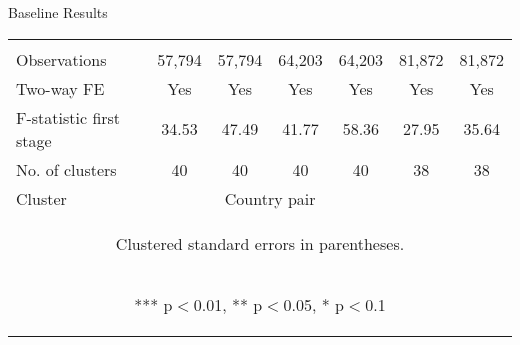 \documentclass[11pt]{beamer}
\begin{document}
\begin{frame}{Baseline Results}
\begin{table}[htbp]
{\begin{tabular}{lcccccc}
\vspace{4pt} & \begin{footnotesize}\end{footnotesize} & \begin{footnotesize}\end{footnotesize} & \begin{footnotesize}\end{footnotesize} & \begin{footnotesize}\end{footnotesize} & \begin{footnotesize}\end{footnotesize} & \begin{footnotesize}\end{footnotesize} \\
Observations & 57,794 & 57,794 & 64,203 & 64,203 & 81,872 & 81,872 \\
Two-way FE & Yes & Yes & Yes & Yes & Yes & Yes \\
F-statistic first stage & 34.53 & 47.49 & 41.77 & 58.36 & 27.95 & 35.64 \\
No. of clusters & 40 & 40 & 40 & 40 & 38 & 38 \\
Cluster & &\multicolumn{2}{c}{Country pair} \\ \hline
\multicolumn{7}{c}{\begin{footnotesize} Clustered standard errors in parentheses. \end{footnotesize} }\\
\multicolumn{7}{c}{\begin{footnotesize} *** p$<$0.01, ** p$<$0.05, * p$<$0.1\end{footnotesize}} \\\end{tabular}
}
\end{table}
\end{frame}
\end{document}
